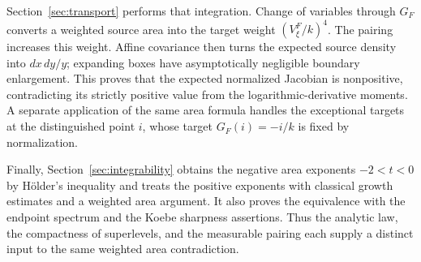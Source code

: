 Section~\ref{sec:transport} performs that integration. Change of
variables through $G_F$ converts a weighted source area into the target
weight $(V_\xi^F/k)^4$. The pairing increases this weight. Affine
covariance then turns the expected source density into $dx\,dy/y$;
expanding boxes have asymptotically negligible boundary enlargement.
This proves that the expected normalized Jacobian is nonpositive,
contradicting its strictly positive value from the logarithmic-derivative
moments. A separate application of the same area formula handles the
exceptional targets at the distinguished point $i$, whose target
$G_F(i)=-i/k$ is fixed by normalization.

Finally, Section~\ref{sec:integrability} obtains the negative area
exponents $-2<t<0$ by H\"older's inequality and treats the positive exponents
with classical growth estimates and a weighted area argument. It
also proves the equivalence with the endpoint spectrum and the Koebe
sharpness assertions. Thus the analytic law, the compactness of
superlevels, and the measurable pairing each supply a distinct input
to the same weighted area contradiction.
